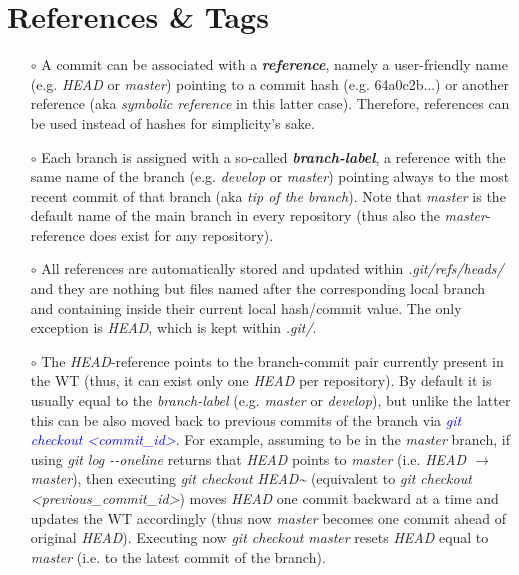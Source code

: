 \documentclass[a4paper,portrait,10pt]{article}   %
\newcommand{\mybulletlvA}{$\circ$}   %
\newcommand{\mycmd}[1]{\textcolor{blue}{\textit{#1}}}   %
\newcommand{\myparvspace}{\vspace{4mm}}   %
\begin{document}

\section{References \& Tags}   \label{sec:RefsTags}

\begin{itemize}
\item[\mybulletlvA] A commit can be associated with a \textbf{\textit{reference}}, namely a user-friendly name (e.g. \textit{HEAD} or \textit{master}) pointing to a commit hash (e.g. 64a0c2b...) or another reference (aka \textit{symbolic reference} in this latter case). Therefore, references can be used instead of hashes for simplicity's sake.
\myparvspace

\item[\mybulletlvA] Each branch is assigned with a so-called \textbf{\textit{branch-label}}, a reference with the same name of the branch (e.g. \textit{develop} or \textit{master}) pointing always to the most recent commit of that branch (aka \textit{tip of the branch}). Note that \textit{master} is the default name of the main branch in every repository (thus also the \textit{master}-reference does exist for any repository).
\myparvspace

\item[\mybulletlvA] All references are automatically stored and updated within \textit{.git/refs/heads/} and they are nothing but files named after the corresponding local branch and containing inside their current local hash/commit value. The only exception is \textit{HEAD}, which is kept within \textit{.git/}.
\myparvspace

\item[\mybulletlvA] The \textit{HEAD}-reference points to the branch-commit pair currently present in the WT (thus, it can exist only one \textit{HEAD} per repository). By default it is usually equal to the \textit{branch-label} (e.g. \textit{master} or \textit{develop}), but unlike the latter this can be also moved back to previous commits of the branch via \mycmd{git checkout <commit\_id>}. For example, assuming to be in the \textit{master} branch, if using \textit{git log -{}-oneline} returns that \textit{HEAD} points to \textit{master} (i.e. \textit{HEAD $\rightarrow$ master}), then executing \textit{git checkout HEAD\textasciitilde} (equivalent to \textit{git checkout <previous\_commit\_id>}) moves \textit{HEAD} one commit backward at a time and updates the WT accordingly (thus now \textit{master} becomes one commit ahead of original \textit{HEAD}). Executing now \textit{git checkout master} resets \textit{HEAD} equal to \textit{master} (i.e. to the latest commit of the branch).
\myparvspace


\end{itemize}
\end{document}

